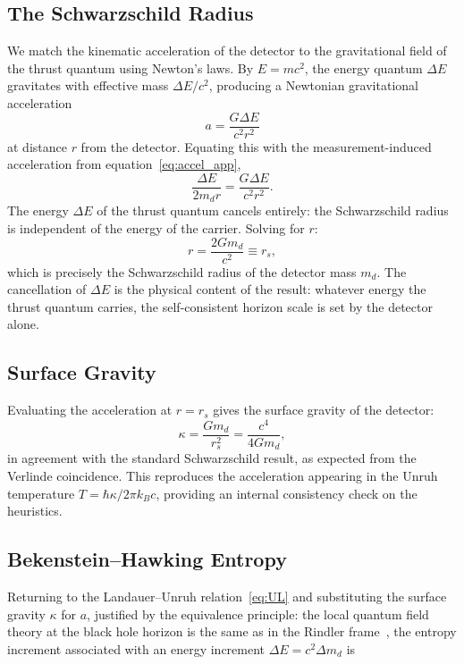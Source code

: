 \documentclass[12pt,a4paper]{article}
\begin{document}
\subsection{The Schwarzschild Radius}

We match the kinematic acceleration of the detector to the 
gravitational field of the thrust quantum using Newton's laws. 
By $E = mc^2$, the energy quantum $\Delta E$ gravitates with 
effective mass $\Delta E / c^2$, producing a Newtonian 
gravitational acceleration
\begin{equation}
a = \frac{G \Delta E}{c^2 r^2}
\end{equation}
at distance $r$ from the detector. Equating this with the 
measurement-induced acceleration from equation~\eqref{eq:accel_app},
\begin{equation}
\frac{\Delta E}{2 m_d r} = \frac{G \Delta E}{c^2 r^2}.
\end{equation}
The energy $\Delta E$ of the thrust quantum cancels entirely: 
the Schwarzschild radius is independent of the energy of the 
carrier. Solving for $r$:
\begin{equation}
r = \frac{2 G m_d}{c^2} \equiv r_s,
\end{equation}
which is precisely the Schwarzschild radius of the detector 
mass $m_d$. The cancellation of $\Delta E$ is the physical 
content of the result: whatever energy the thrust quantum 
carries, the self-consistent horizon scale is set by the 
detector alone.

\subsection{Surface Gravity}
Evaluating the acceleration at $r = r_s$ gives the surface gravity of the detector:
\begin{equation}
\kappa = \frac{G m_d}{r_s^2} = \frac{c^4}{4 G m_d},
\end{equation}
in agreement with the standard Schwarzschild result, 
as expected from the Verlinde coincidence. This 
reproduces the acceleration appearing in the Unruh 
temperature $T = \hbar \kappa / 2\pi k_B c$, 
providing an internal consistency check on the 
heuristics.

\subsection{Bekenstein--Hawking Entropy}
\label{sec:bekenstein}

Returning to the Landauer--Unruh relation~\eqref{eq:UL} and 
substituting the surface gravity $\kappa$ for $a$, justified 
by the equivalence principle: the local quantum field theory at 
the black hole horizon is the same as in the Rindler 
frame~\cite{unruh1976notes, hawking1975particle}, the entropy 
increment associated with an energy increment 
$\Delta E = c^2 \Delta m_d$ is
\end{document}

